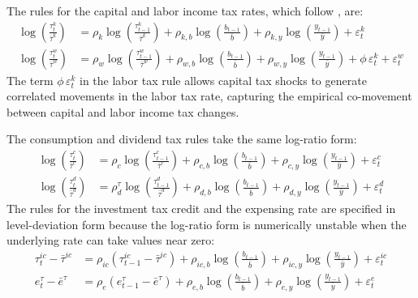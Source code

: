 \documentclass[article,11pt,letterpaper,fleqn]{article}
\theoremstyle{definition}
\numberwithin{equation}{section}
\begin{document}
The rules for the capital and labor income tax rates, which follow \citet{Zubairy2014}, are:
\begin{align}
\log\!\left(\frac{\tau_t^k}{\bar{\tau}^k}\right) &= \rho_k\log\!\left(\frac{\tau_{t-1}^k}{\bar{\tau}^k}\right) + \rho_{k,b}\log\!\left(\frac{b_{t-1}}{\bar{b}}\right) + \rho_{k,y}\log\!\left(\frac{y_{t-1}}{\bar{y}}\right) + \varepsilon_t^k \label{eq:taukrule} \\
\log\!\left(\frac{\tau_t^w}{\bar{\tau}^w}\right) &= \rho_w\log\!\left(\frac{\tau_{t-1}^w}{\bar{\tau}^w}\right) + \rho_{w,b}\log\!\left(\frac{b_{t-1}}{\bar{b}}\right) + \rho_{w,y}\log\!\left(\frac{y_{t-1}}{\bar{y}}\right) + \phi\,\varepsilon_t^k + \varepsilon_t^w \label{eq:taukwrule}
\end{align}
The term $\phi\,\varepsilon_t^k$ in the labor tax rule allows capital tax shocks to generate correlated movements in the labor tax rate, capturing the empirical co-movement between capital and labor income tax changes.

The consumption and dividend tax rules take the same log-ratio form:
\begin{align}
\log\!\left(\frac{\tau_t^c}{\bar{\tau}^c}\right) &= \rho_c\log\!\left(\frac{\tau_{t-1}^c}{\bar{\tau}^c}\right) + \rho_{c,b}\log\!\left(\frac{b_{t-1}}{\bar{b}}\right) + \rho_{c,y}\log\!\left(\frac{y_{t-1}}{\bar{y}}\right) + \varepsilon_t^c \label{eq:taucrule} \\
\log\!\left(\frac{\tau_t^d}{\bar{\tau}^d}\right) &= \rho_d^{\tau}\log\!\left(\frac{\tau_{t-1}^d}{\bar{\tau}^d}\right) + \rho_{d,b}\log\!\left(\frac{b_{t-1}}{\bar{b}}\right) + \rho_{d,y}\log\!\left(\frac{y_{t-1}}{\bar{y}}\right) + \varepsilon_t^d \label{eq:taudrule}
\end{align}
The rules for the investment tax credit and the expensing rate are specified in level-deviation form because the log-ratio form is numerically unstable when the underlying rate can take values near zero:
\begin{align}
\tau_t^{ic} - \bar{\tau}^{ic} &= \rho_{ic}(\tau_{t-1}^{ic} - \bar{\tau}^{ic}) + \rho_{ic,b}\log\!\left(\frac{b_{t-1}}{\bar{b}}\right) + \rho_{ic,y}\log\!\left(\frac{y_{t-1}}{\bar{y}}\right) + \varepsilon_t^{ic} \label{eq:tauicrule} \\
e_t^{\tau} - \bar{e}^{\tau} &= \rho_{e}(e_{t-1}^{\tau} - \bar{e}^{\tau}) + \rho_{e,b}\log\!\left(\frac{b_{t-1}}{\bar{b}}\right) + \rho_{e,y}\log\!\left(\frac{y_{t-1}}{\bar{y}}\right) + \varepsilon_t^{e} \label{eq:etaurule}
\end{align}
\end{document}
